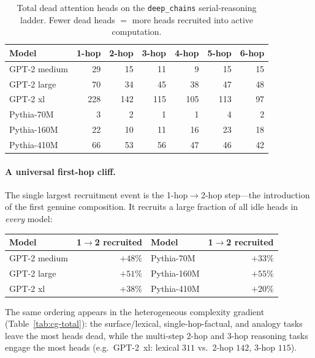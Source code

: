 \documentclass[11pt]{article}
\begin{document}
\begin{table}[h]
\centering
\caption{Total dead attention heads on the \texttt{deep\_chains} serial-reasoning
ladder. Fewer dead heads $=$ more heads recruited into active computation.}
\label{tab:dc-total}
\small
\begin{tabular}{lrrrrrr}
\toprule
Model & 1-hop & 2-hop & 3-hop & 4-hop & 5-hop & 6-hop \\
\midrule
GPT-2 medium & 29 & 15 & 11 & 9 & 15 & 15 \\
GPT-2 large & 70 & 34 & 45 & 38 & 47 & 48 \\
GPT-2 xl & 228 & 142 & 115 & 105 & 113 & 97 \\
Pythia-70M & 3 & 2 & 1 & 1 & 4 & 2 \\
Pythia-160M & 22 & 10 & 11 & 16 & 23 & 18 \\
Pythia-410M & 66 & 53 & 56 & 47 & 46 & 42 \\
\bottomrule
\end{tabular}
\end{table}

\paragraph{A universal first-hop cliff.}
The single largest recruitment event is the \mbox{1-hop$\to$2-hop} step---the
introduction of the first genuine composition. It recruits a large fraction of
all idle heads in \emph{every} model:
\begin{center}
\small
\begin{tabular}{lrlr}
\toprule
Model & 1$\to$2 recruited & Model & 1$\to$2 recruited \\
\midrule
GPT-2 medium & $+48\%$ & Pythia-70M  & $+33\%$ \\
GPT-2 large  & $+51\%$ & Pythia-160M & $+55\%$ \\
GPT-2 xl     & $+38\%$ & Pythia-410M & $+20\%$ \\
\bottomrule
\end{tabular}
\end{center}
The same ordering appears in the heterogeneous complexity gradient
(Table~\ref{tab:cg-total}): the surface/lexical, single-hop-factual, and
analogy tasks leave the most heads dead, while the multi-step 2-hop and 3-hop
reasoning tasks engage the most heads (e.g.\ GPT-2~xl: lexical $311$ vs.\
2-hop $142$, 3-hop $115$).
\end{document}

